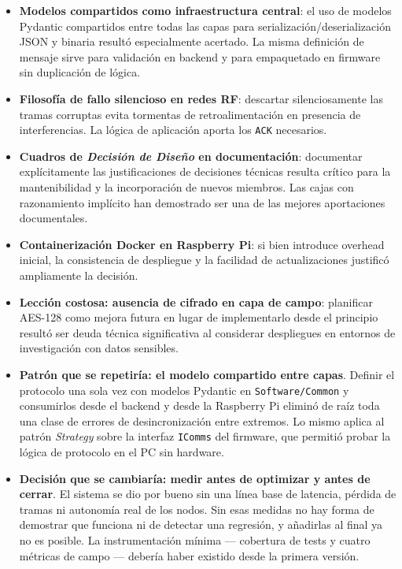 \begin{itemize}[leftmargin=*]
    \item \textbf{Modelos compartidos como infraestructura central}:
    el uso de modelos Pydantic compartidos entre todas las capas para
    serializaci\'on/deserializaci\'on JSON y binaria result\'o
    especialmente acertado. La misma definici\'on de mensaje sirve
    para validaci\'on en backend y para empaquetado en firmware sin
    duplicaci\'on de l\'ogica.

    \item \textbf{Filosof\'ia de fallo silencioso en redes RF}: descartar
    silenciosamente las tramas corruptas evita tormentas de
    retroalimentaci\'on en presencia de interferencias. La l\'ogica de
    aplicaci\'on aporta los \texttt{ACK} necesarios.

    \item \textbf{Cuadros de \textit{Decisi\'on de Dise\~no} en
    documentaci\'on}: documentar expl\'icitamente las justificaciones de
    decisiones t\'ecnicas resulta cr\'itico para la mantenibilidad y la
    incorporaci\'on de nuevos miembros. Las cajas con razonamiento
    impl\'icito han demostrado ser una de las mejores aportaciones
    documentales.

    \item \textbf{Containerizaci\'on Docker en Raspberry Pi}: si bien
    introduce overhead inicial, la consistencia de despliegue y la
    facilidad de actualizaciones justific\'o ampliamente la decisi\'on.

    \item \textbf{Lecci\'on costosa: ausencia de cifrado en capa de
    campo}: planificar AES-128 como mejora futura en lugar de
    implementarlo desde el principio result\'o ser deuda t\'ecnica
    significativa al considerar despliegues en entornos de
    investigaci\'on con datos sensibles.

    \item \textbf{Patr\'on que se repetir\'ia: el modelo compartido
    entre capas}. Definir el protocolo una sola vez con modelos Pydantic
    en \texttt{Software/Common} y consumirlos desde el backend y desde la
    Raspberry Pi elimin\'o de ra\'iz toda una clase de errores de
    desincronizaci\'on entre extremos. Lo mismo aplica al patr\'on
    \textit{Strategy} sobre la interfaz \texttt{IComms} del firmware, que
    permiti\'o probar la l\'ogica de protocolo en el PC sin hardware.

    \item \textbf{Decisi\'on que se cambiar\'ia: medir antes de
    optimizar y antes de cerrar}. El sistema se dio por bueno sin una
    l\'inea base de latencia, p\'erdida de tramas ni autonom\'ia real de
    los nodos. Sin esas medidas no hay forma de demostrar que funciona ni
    de detectar una regresi\'on, y a\~nadirlas al final ya no es posible.
    La instrumentaci\'on m\'inima --- cobertura de tests y cuatro
    m\'etricas de campo --- deber\'ia haber existido desde la primera
    versi\'on.


\end{itemize}
